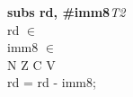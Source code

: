 


\begin{instructionblock}{\imagewidth}%
    \textbf{subs rd, \#imm8}\hfill\textit{T2}\\
    rd $\in$ \baseregisters\\
    imm8 $\in$ \immEight\\
    {N Z C V}\\
    rd = rd - imm8;
\end{instructionblock}

